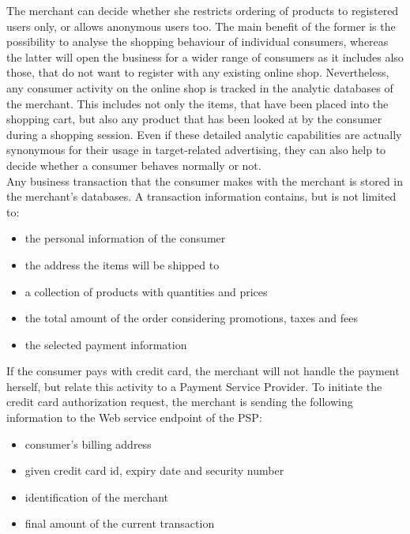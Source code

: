 The merchant can decide whether she restricts ordering of products to registered users only, or allows anonymous users too. The main benefit of the former is the possibility to analyse the shopping behaviour of individual consumers, whereas the latter will open the business for a wider range of consumers as it includes also those, that do not want to register with any existing online shop. Nevertheless, any consumer activity on the online shop is tracked in the analytic databases of the merchant. This includes not only the items, that have been placed into the shopping cart, but also any product that has been looked at by the consumer during a shopping session. Even if these detailed analytic capabilities are actually synonymous for their usage in target-related advertising, they can also help to decide whether a consumer behaves normally or not. \\

Any business transaction that the consumer makes with the merchant is stored in the merchant's databases. A transaction information contains, but is not limited to:\@

\begin{itemize}
		\item the personal information of the consumer
		\item the address the items will be shipped to
		\item a collection of products with quantities and prices
		\item the total amount of the order considering promotions, taxes and fees
		\item the selected payment information
\end{itemize}

If the consumer pays with credit card, the merchant will not handle the payment herself, but relate this activity to a Payment Service Provider. To initiate the credit card authorization request, the merchant is sending the following information to the Web service endpoint of the \gls{PSP}: \@

\begin{itemize}
    \item consumer's billing address
    \item given credit card id, expiry date and security number
    \item identification of the merchant
    \item final amount of the current transaction
\end{itemize}

